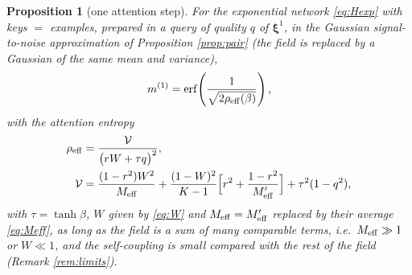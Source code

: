 \documentclass{SciPost}
\theoremstyle{plain}
\newtheorem{proposition}{Proposition}
\theoremstyle{definition}
\newcommand{\x}{\bm{\xi}}
\newcommand{\Meff}{M_{\rm eff}}
\newcommand{\erf}{\mathrm{erf}}
\begin{document}
\begin{proposition}[one attention step]\label{prop:main}
For the exponential network \eqref{eq:Hexp} with keys $=$ examples, prepared in a query of quality $q$ of $\x^1$, in the Gaussian signal-to-noise approximation of Proposition \ref{prop:pair} (the field is replaced by a Gaussian of the same mean and variance),
\begin{equation}
m^{(1)}=\erf\!\left(\frac{1}{\sqrt{2\rho_{\rm eff}(\beta)}}\right),
\label{eq:main}
\end{equation}
with the attention entropy
\begin{align}
\rho_{\rm eff}&=\frac{\mathcal V}{\big(rW+\tau q\big)^2},\label{eq:rhoeff}\\
\mathcal V&=\frac{(1-r^2)W^2}{\Meff}+\frac{(1-W)^2}{K-1}\Big[r^2+\frac{1-r^2}{\Meff'}\Big]+\tau^2(1-q^2),\nonumber
\end{align}
with $\tau=\tanh\beta$, $W$ given by \eqref{eq:W} and $\Meff=\Meff'$ replaced by their average \eqref{eq:Meff}, as long as the field is a sum of many comparable terms, i.e.\ $\Meff\gg1$ or $W\ll1$, and the self-coupling is small compared with the rest of the field (Remark \ref{rem:limits}).
\end{proposition}
\end{document}
